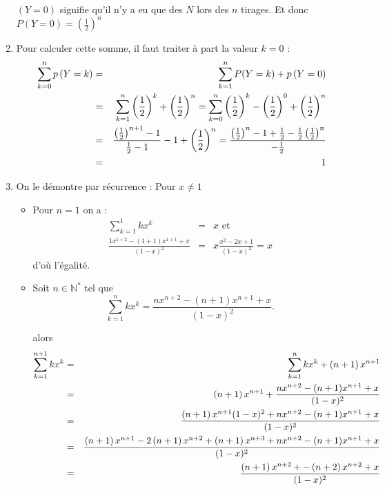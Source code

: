\begin{correction}
\begin{enumerate}
$\left( Y=0\right) $ signifie qu'il n'y a eu que des $N$ lors des $n$
tirages. Et donc $\displaystyle P(Y=0)=\left( \frac{1}{2}\right) ^{n}$

\item Pour calculer cette somme, il faut traiter \`{a} part la valeur $k=0$
: 
\begin{eqnarray*}
\sum_{k=0}^{n}p\left( Y=k\right) &=&\sum_{k=1}^{n}P(Y=k)+p\left( Y=0\right)
\\
&=&\sum_{k=1}^{n}\left( \frac{1}{2}\right) ^{k}+\left( \frac{1}{2}\right)
^{n}=\sum_{k=0}^{n}\left( \frac{1}{2}\right) ^{k}-\left( \frac{1}{2}\right)
^{0}+\left( \frac{1}{2}\right) ^{n} \\
&=&\frac{\left( \frac{1}{2}\right) ^{n+1}-1}{\frac{1}{2}-1}-1+\left( \frac{1%
}{2}\right) ^{n}=\frac{\left( \frac{1}{2}\right) ^{n}-1+\frac{1}{2}-\frac{1}{%
2}\left( \frac{1}{2}\right) ^{n}}{-\frac{1}{2}} \\
&=&1
\end{eqnarray*}

\item On le d\'{e}montre par r\'{e}currence : Pour $x\neq 1$

\begin{itemize}
\item Pour $n=1$ on a : 
\begin{eqnarray*}
\sum_{k=1}^{1}kx^{k} &=&x\mbox{ et } \\
\frac{1x^{1+2}-(1+1)x^{1+1}+x}{(1-x)^{2}} &=&x\frac{x^{2}-2x+1}{(1-x)^{2}}=x
\end{eqnarray*}
d'o\`{u} l'\'{e}galit\'{e}.

\item Soit $n\in \mathbb{N}^{*}$ tel que 
\begin{equation*}
\sum_{k=1}^{n}kx^{k}=\frac{nx^{n+2}-(n+1)x^{n+1}+x}{(1-x)^{2}}.
\end{equation*}

alors 
\begin{eqnarray*}
\sum_{k=1}^{n+1}kx^{k} &=&\sum_{k=1}^{n}kx^{k}+\left( n+1\right) x^{n+1} \\
&=&\left( n+1\right) x^{n+1}+\frac{nx^{n+2}-(n+1)x^{n+1}+x}{(1-x)^{2}} \\
&=&\frac{\left( n+1\right) x^{n+1}(1-x)^{2}+nx^{n+2}-(n+1)x^{n+1}+x}{%
(1-x)^{2}} \\
&=&\frac{\left( n+1\right) x^{n+1}-2\left( n+1\right) x^{n+2}+\left(
n+1\right) x^{n+3}+nx^{n+2}-(n+1)x^{n+1}+x}{(1-x)^{2}} \\
&=&\frac{\left( n+1\right) x^{n+3}+-\left( n+2\right) x^{n+2}+x}{(1-x)^{2}}
\end{eqnarray*}


\end{itemize}
\end{enumerate}
\end{correction}
